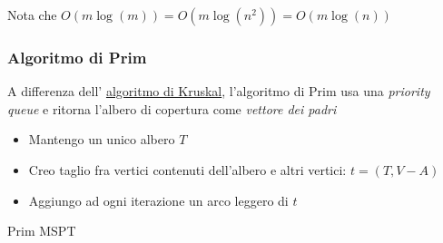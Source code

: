 Nota che $ O\left(m \log \left(m\right)\right)  = O\left(m \log \left(n^2 \right)\right) = O\left(m \log \left(n\right)\right)$
\subsubsection{Algoritmo di Prim}
A differenza dell' \hyperref[algoritmo di kruskal]{algoritmo di Kruskal}, l'algoritmo di Prim usa una \textit{priority queue} e ritorna l'albero di copertura come \emph{vettore dei padri}
\begin{itemize}
	\item Mantengo un unico albero $ T $
	\item Creo taglio fra vertici contenuti dell'albero e altri vertici: $ t = \left(T, V-A\right) $
	\item Aggiungo ad ogni iterazione un arco leggero di $ t $
\end{itemize}
\vskip3mm
\begin{algoritmo}{Prim MSPT}
	\begin{algorithm}[H]
		\caption{Prim's Algorithm}


	\end{algorithm}
\end{algoritmo}

